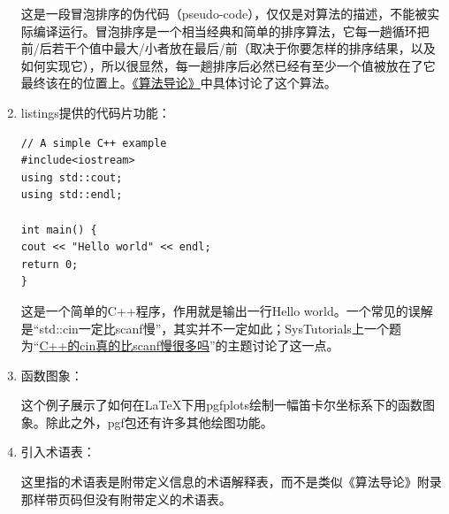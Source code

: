 \begin{enumerate}
这是一段冒泡排序的伪代码（pseudo-code），仅仅是对算法的描述，不能被实际编译运行。冒泡排序是一个相当经典和简单的排序算法，它每一趟循环把前/后若干个值中最大/小者放在最后/前（取决于你要怎样的排序结果，以及如何实现它），所以很显然，每一趟排序后必然已经有至少一个值被放在了它最终该在的位置上。\href{https://labs.xjtudlc.com/labs/wldmt/reading\%20list/books/Algorithms\%20and\%20optimization/Introduction\%20to\%20Algorithms.pdf}{《算法导论》}中具体讨论了这个算法。

\item listings提供的代码片功能：

\begin{lstlisting}[style = GNU_Cpp20_DevCpp]
// A simple C++ example
#include<iostream>
using std::cout;
using std::endl;

int main() {
cout << "Hello world" << endl;
return 0;
}
\end{lstlisting}

这是一个简单的C++程序，作用就是输出一行Hello world。一个常见的误解是“std::cin一定比scanf慢”，其实并不一定如此；SysTutorials上一个题为“\href{https://www.systutorials.com/is-cin-much-slower-than-scanf-in-c/}{C++的cin真的比scanf慢很多吗}”的主题讨论了这一点。

\item 函数图象：

\begin{figure}[H]
	\centering
\end{figure}

这个例子展示了如何在\LaTeX 下用pgfplots绘制一幅笛卡尔坐标系下的函数图象。除此之外，pgf包还有许多其他绘图功能。

\item 引入术语表：


这里指的术语表是附带定义信息的术语解释表，而不是类似《算法导论》附录那样带页码但没有附带定义的术语表。

\printnomenclature

\end{enumerate}

